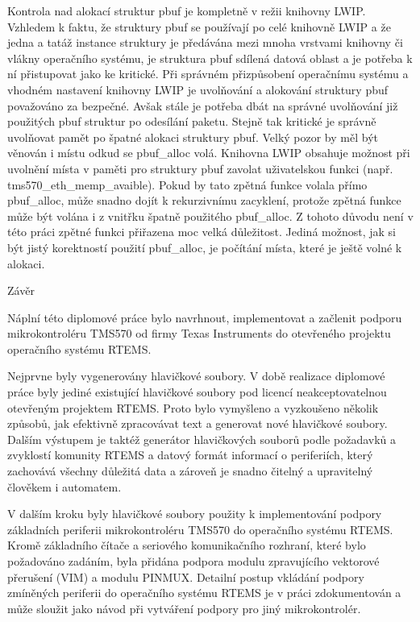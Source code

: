 Kontrola nad alokací struktur pbuf je kompletně v režii knihovny LWIP. Vzhledem k faktu, že struktury pbuf se používají po celé knihovně LWIP a že jedna a tatáž instance struktury je předávána mezi mnoha vrstvami knihovny či vlákny operačního systému, je struktura pbuf sdílená datová oblast a je potřeba k ní přistupovat jako ke kritické. Při správném přizpůsobení operačnímu systému a vhodném nastavení knihovny LWIP je uvolňování a alokování struktury pbuf považováno za bezpečné. Avšak stále je potřeba dbát na správné uvolňování již použitých pbuf struktur po odesílání paketu. Stejně tak kritické je správně uvolňovat pamět po špatné alokaci struktury pbuf. Velký pozor by měl být věnován i místu odkud se pbuf\_alloc volá. Knihovna LWIP obsahuje možnost při uvolnění místa v paměti pro struktury pbuf zavolat uživatelskou funkci (např. tms570\_eth\_memp\_avaible). Pokud by tato zpětná funkce volala přímo pbuf\_alloc, může snadno dojít k rekurzivnímu zacyklení, protože zpětná funkce může být volána i z vnitřku špatně použitého pbuf\_alloc. Z tohoto důvodu není v této práci zpětné funkci přiřazena moc velká důležitost. Jediná možnost, jak si být jistý korektností použití pbuf\_alloc, je počítání místa, které je ještě volné k alokaci.

\chap Závěr

Náplní této diplomové práce bylo navrhnout, implementovat a začlenit podporu mikrokontroléru TMS570 od firmy Texas Instruments do otevřeného projektu operačního systému RTEMS.

\medskip

Nejprvne byly vygenerovány hlavičkové soubory. V době realizace diplomové práce byly jediné existující hlavičkové soubory pod licencí neakceptovatelnou otevřeným projektem RTEMS. Proto bylo vymyšleno a vyzkoušeno několik způsobů, jak efektivně zpracovávat text a generovat nové hlavičkové soubory. Dalším výstupem je taktéž generátor hlavičkových souborů podle požadavků a zvyklostí komunity RTEMS a datový formát informací o periferiích, který zachovává všechny důležitá data a zároveň je snadno čitelný a upravitelný člověkem i automatem.

V dalším kroku byly hlavičkové soubory použity k implementování podpory základních periferii mikrokontroléru TMS570 do operačního systému RTEMS. Kromě základního čítače a seriového komunikačního rozhraní, které bylo požadováno zadáním, byla přidána podpora modulu zpravujícího vektorové přerušení (VIM) a modulu PINMUX. Detailní postup vkládání podpory zmíněných periferii do operačního systému RTEMS je v práci zdokumentován a může sloužit jako návod při vytváření podpory pro jiný mikrokontrolér.


